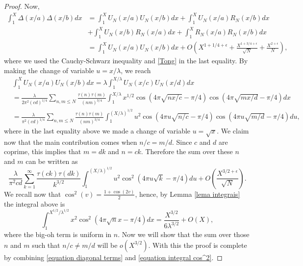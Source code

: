 \documentclass[a4paper,12pt, reqn0]{amsart}
\theoremstyle{remark}
\begin{document}
\begin{proof}
Now, 
\begin{align*}
\int_{1}^X\Delta(x/a)\Delta(x/b)dx&=\int_{1}^X U_N(x/a)U_N(x/b)dx+\int_{1}^X U_N(x/a)R_N(x/b)dx\\
&+\int_{1}^X U_N(x/b)R_N(x/a)dx+\int_{1}^X R_N(x/a)R_N(x/b)dx\\
&=\int_{1}^X U_N(x/a)U_N(x/b)dx+O\left(X^{1+1/4+\epsilon}+\frac{X^{1+3/4+\epsilon}}{\sqrt{N}} +\frac{X^{2+\epsilon}}{N} \right),
\end{align*}
	where we used the Cauchy-Schwarz inequality and \eqref{Tong} in the last equality.  By making the change of variable $u=x/\lambda$, we reach
\begin{align*}
&\int_{1}^X U_N(x/a)U_N(x/b)dx=\lambda\int_{1}^{X/\lambda} U_N(x/c)U_N(x/d)dx\\
&=\frac{\lambda}{2\pi^2(cd)^{1/4}}\sum_{n,m\leq N}\frac{\tau(n)\tau(m)}{(nm)^{3/4}}\int_{1}^{X/\lambda} x^{1/2}\cos(4\pi\sqrt{nx/c}-\pi/4)\cos(4\pi\sqrt{mx/d}-\pi/4)dx \\
&=\frac{\lambda}{\pi^2(cd)^{1/4}}
\sum_{n,m\leq N}
\frac{\tau(n)\tau(m)}{(nm)^{3/4}}
\int_{1}^{(X/\lambda)^{1/2}} u^2 
\cos(4\pi u\sqrt{n/c}-\pi/4)\cos(4\pi u\sqrt{m/d}-\pi/4)du,
\end{align*}
where in the last equality above we made a change of variable $u=\sqrt{x}$. We claim now that the main contribution comes when 
$n/c=m/d$. Since $c$ and $d$ are coprime, this implies that
$m=dk$ and $n=ck$. Therefore
the sum over these $n$ and $m$ can be written as
\begin{equation}
\label{equation diagonal terms}
\frac{\lambda}{\pi^2cd}
\sum_{k=1}^\infty
\frac{\tau(ck)\tau(dk)}{k^{3/2}}
\int_{1}^{(X/\lambda)^{1/2}} u^2\cos^2(4\pi u\sqrt{k}-\pi/4) du+O\left(\frac{X^{3/2+\epsilon}}{\sqrt{N}}\right).
\end{equation}
We recall now that $\cos^2(v)=\frac{1+\cos(2v)}{2}$, 
hence, by Lemma \ref{lema integrais} the integral above is
\begin{equation}\label{equation integral cos^2}
\int_{1}^{X^{1/2}/\lambda^{1/2}} x^2\cos^2(4\pi\sqrt{n}x-\pi/4)dx=\frac{X^{3/2}}{6\lambda^{3/2}}+O(X),
\end{equation}
where the big-oh term is uniform in $n$. 
Now we will show that the sum over those $n$ and $m$ such that $n/c\neq m/d$ will be $o(X^{3/2})$. 
With this the proof is complete by combining \eqref{equation diagonal terms} and \eqref{equation integral cos^2}. 


\end{proof}
\end{document}
